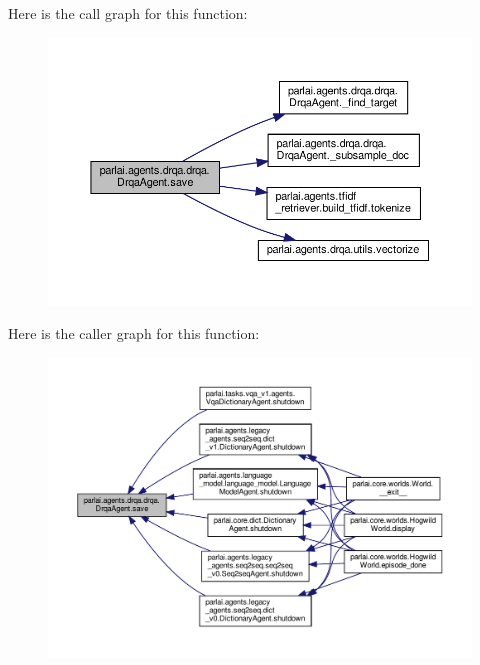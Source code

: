 Here is the call graph for this function\+:
\nopagebreak
\begin{figure}[H]
\begin{center}
\leavevmode
\includegraphics[width=350pt]{classparlai_1_1agents_1_1drqa_1_1drqa_1_1DrqaAgent_a654906588f91d21110921ad2ba498c95_cgraph}
\end{center}
\end{figure}
Here is the caller graph for this function\+:
\nopagebreak
\begin{figure}[H]
\begin{center}
\leavevmode
\includegraphics[width=350pt]{classparlai_1_1agents_1_1drqa_1_1drqa_1_1DrqaAgent_a654906588f91d21110921ad2ba498c95_icgraph}
\end{center}
\end{figure}
\mbox{\label{classparlai_1_1agents_1_1drqa_1_1drqa_1_1DrqaAgent_a7346d6aa37ecb54779c9cf67a0ffef39}} 
